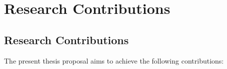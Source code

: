 \section{Research Contributions}
\label{sec:research_contributions}



\subsection{Research Contributions}
\label{subsub:research_contributions}
The present thesis proposal aims to achieve the following contributions:

